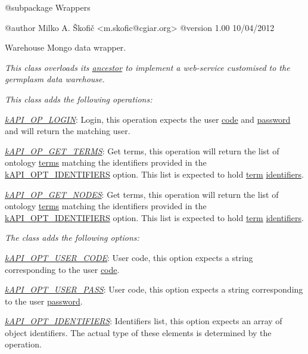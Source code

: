 {\itshape \begin{DoxyVerb} @subpackage        Wrappers

 @author            Milko A. Škofič <m.skofic@cgiar.org>
 @version   1.00 10/04/2012\end{DoxyVerb}
}

{\itshape \begin{DoxyVerb} Warehouse Mongo data wrapper.
\end{DoxyVerb}
}

{\itshape This class overloads its \hyperlink{class_c_mongo_data_wrapper}{ancestor} to implement a web-\/service customised to the germplasm data warehouse.}

{\itshape This class adds the following operations\-:}

{\itshape 
\begin{DoxyItemize}
\item {\itshape \hyperlink{}{k\-A\-P\-I\-\_\-\-O\-P\-\_\-\-L\-O\-G\-I\-N}}\-: Login, this operation expects the user \hyperlink{}{code} and \hyperlink{}{password} and will return the matching user. 
\item {\itshape \hyperlink{}{k\-A\-P\-I\-\_\-\-O\-P\-\_\-\-G\-E\-T\-\_\-\-T\-E\-R\-M\-S}}\-: Get terms, this operation will return the list of ontology \hyperlink{class_c_ontology_term}{terms} matching the identifiers provided in the \hyperlink{}{k\-A\-P\-I\-\_\-\-O\-P\-T\-\_\-\-I\-D\-E\-N\-T\-I\-F\-I\-E\-R\-S} option. This list is expected to hold \hyperlink{class_c_ontology_term}{term} \hyperlink{}{identifiers}. 
\item {\itshape \hyperlink{}{k\-A\-P\-I\-\_\-\-O\-P\-\_\-\-G\-E\-T\-\_\-\-N\-O\-D\-E\-S}}\-: Get terms, this operation will return the list of ontology \hyperlink{class_c_ontology_term}{terms} matching the identifiers provided in the \hyperlink{}{k\-A\-P\-I\-\_\-\-O\-P\-T\-\_\-\-I\-D\-E\-N\-T\-I\-F\-I\-E\-R\-S} option. This list is expected to hold \hyperlink{class_c_ontology_term}{term} \hyperlink{}{identifiers}. 
\end{DoxyItemize}}

{\itshape The class adds the following options\-:}

{\itshape 
\begin{DoxyItemize}
\item {\itshape \hyperlink{}{k\-A\-P\-I\-\_\-\-O\-P\-T\-\_\-\-U\-S\-E\-R\-\_\-\-C\-O\-D\-E}}\-: User code, this option expects a string corresponding to the user \hyperlink{class_c_coded_unit_object_a56af949800e65f9a283239d2e455259f}{code}. 
\item {\itshape \hyperlink{}{k\-A\-P\-I\-\_\-\-O\-P\-T\-\_\-\-U\-S\-E\-R\-\_\-\-P\-A\-S\-S}}\-: User code, this option expects a string corresponding to the user \hyperlink{class_c_user_a0e6f1cf51ad23f971ed0999f8d248c8d}{password}. 
\item {\itshape \hyperlink{}{k\-A\-P\-I\-\_\-\-O\-P\-T\-\_\-\-I\-D\-E\-N\-T\-I\-F\-I\-E\-R\-S}}\-: Identifiers list, this option expects an array of object identifiers. The actual type of these elements is determined by the operation. 
\end{DoxyItemize}}

